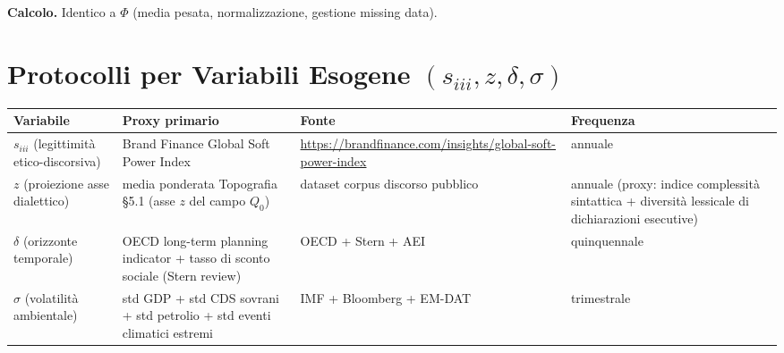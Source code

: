 \Hypoth{} \textbf{Calcolo.} Identico a \(\Phi\) (media pesata,
normalizzazione, gestione missing data).



\section{\texorpdfstring{Protocolli per Variabili Esogene
\((s_{iii}, z, \delta, \sigma)\)}{Protocolli per Variabili Esogene (s\_\{iii\}, z, \textbackslash delta, \textbackslash sigma)}}\label{protocolli-per-variabili-esogene-s_iii-z-delta-sigma}

{\def\LTcaptype{none} %
{\small\begin{longtable}[]{@{}
  >{\raggedright\arraybackslash}p{}
  >{\raggedright\arraybackslash}p{}
  >{\raggedright\arraybackslash}p{}
  >{\raggedright\arraybackslash}p{}@{}}
\toprule\noalign{}
\begin{minipage}[b]{\linewidth}\raggedright
Variabile
\end{minipage} & \begin{minipage}[b]{\linewidth}\raggedright
Proxy primario
\end{minipage} & \begin{minipage}[b]{\linewidth}\raggedright
Fonte
\end{minipage} & \begin{minipage}[b]{\linewidth}\raggedright
Frequenza
\end{minipage} \\
\midrule\noalign{}
\endhead
\bottomrule\noalign{}
\endlastfoot
\(s_{iii}\) (legittimità etico-discorsiva) & Brand Finance Global Soft
Power Index &
\url{https://brandfinance.com/insights/global-soft-power-index} &
annuale \\
\(z\) (proiezione asse dialettico) & media ponderata Topografia \S{}5.1
(asse \(z\) del campo \(Q_0\)) & dataset corpus discorso pubblico &
annuale (proxy: indice complessità sintattica + diversità lessicale di
dichiarazioni esecutive) \\
\(\delta\) (orizzonte temporale) & OECD long-term planning indicator +
tasso di sconto sociale (Stern review) & OECD + Stern + AEI &
quinquennale \\
\(\sigma\) (volatilità ambientale) & std GDP + std CDS sovrani + std
petrolio + std eventi climatici estremi & IMF + Bloomberg + EM-DAT &
trimestrale \\
\end{longtable}}
}

